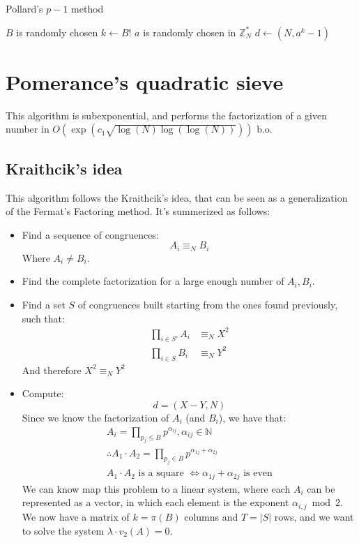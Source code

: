 \begin{algorithm}
\caption{Pollard's $p-1$ method}\label{alg:pollard_p-1_method}
$B$ is randomly chosen\label{pol_p_step_0}\;
$k \gets B!$\;\label{pol_p_step_1}
$a$ is randomly chosen in $\mathbb{Z}_{N}^{*}$\;\label{pol_p_step_2}
$d \gets (N, a^{k} - 1)$\;\label{pol_p_step_3}
\end{algorithm}

\section{Pomerance's quadratic sieve}
This algorithm is subexponential, and performs the factorization of a given number in $O(\operatorname{exp}(c_{1}\sqrt{\operatorname{log}(N)\operatorname{log}(\operatorname{log}(N))}))$ b.o.
\subsection{Kraithcik's idea}
This algorithm follows the Kraithcik's idea, that can be seen as a generalization of the Fermat's Factoring method. It's summerized as follows:
\begin{itemize}
    \item Find a sequence of congruences:
    \[A_{i} \equiv_{N} B_{i}\]
    Where $A_{i} \neq B_{i}$.
    \item Find the complete factorization for a large enough number of $A_{i}, B_{i}$.
    \item Find a set $S$ of congruences built starting from the ones found previously, such that:
    \begin{align*}
        \prod_{i \in S'} A_{i} &\equiv_{N} X^{2} \\
        \prod_{i \in S} B_{i} &\equiv_{N} Y^{2}
    \end{align*}
    And therefore $X^{2} \equiv_{N} Y^{2}$
    \item Compute:
    \[ d = (X - Y, N)\]
    Since we know the factorization of $A_{i}$ (and $B_{i}$), we have that:
    \begin{align*}
        A_{i} = \prod_{p_{j} \leq B} p^{\alpha_{ij}}, \alpha_{ij} \in \mathbb{N} \\
        \therefore A_{1} \cdot A_{2} = \prod_{p_{j} \in B} p^{\alpha_{1j} + \alpha_{2j}} \\
        A_{1} \cdot A_{2} \text{ is a square } \iff \alpha_{1j} + \alpha_{2j} \text{ is even}
    \end{align*}
    We can know map this problem to a linear system, where each $A_{i}$ can be represented as a vector, in which each element is the exponent $\alpha_{i,j} \bmod 2$. \newline
    We now have a matrix of $k = \pi(B)$ columns and $T = |S|$ rows, and we want to solve the system $\lambda \cdot v_{2}(A)= 0$.
\end{itemize}
